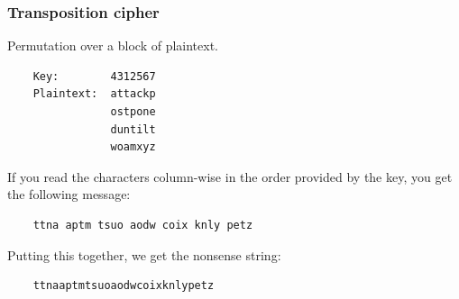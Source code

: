 \documentclass{article}
\begin{document}
\subsubsection{Transposition cipher}
Permutation over a block of plaintext.
\begin{verbatim}
    Key:        4312567
    Plaintext:  attackp
                ostpone
                duntilt
                woamxyz
\end{verbatim}
If you read the characters column-wise in the order provided by the key, you get the following message:
\begin{verbatim}
    ttna aptm tsuo aodw coix knly petz
\end{verbatim}
Putting this together, we get the nonsense string:
\begin{verbatim}
    ttnaaptmtsuoaodwcoixknlypetz
\end{verbatim}
\end{document}
